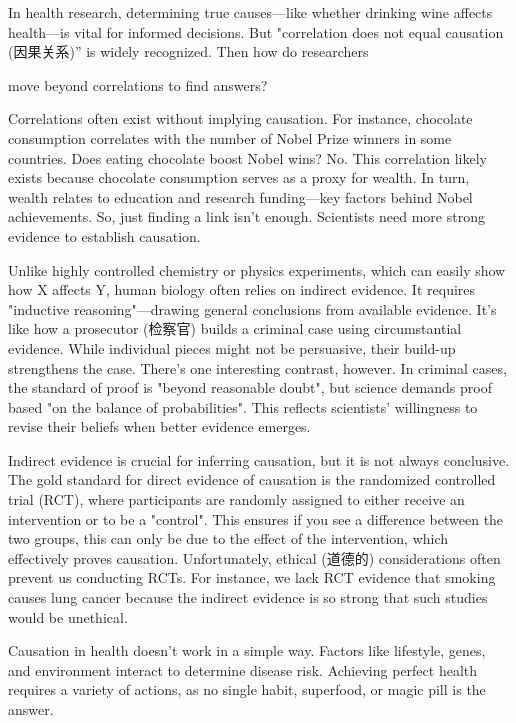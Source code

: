 \documentclass{英语试卷}
\begin{document}
\par In health research, determining true causes—like whether drinking wine affects health—is vital for informed decisions. But "correlation does not equal causation (因果关系)” is widely recognized. Then how do researchers\par
\par move beyond correlations to find answers?\par
\par Correlations often exist without implying causation. For instance, chocolate consumption correlates with the number of Nobel Prize winners in some countries. Does eating chocolate boost Nobel wins? No. This correlation likely exists because chocolate consumption serves as a proxy for wealth. In turn, wealth relates to education and research funding—key factors behind Nobel achievements. So, just finding a link isn't enough. Scientists need more strong evidence to establish causation.\par
\par Unlike highly controlled chemistry or physics experiments, which can easily show how X affects Y, human biology often relies on indirect evidence. It requires "inductive reasoning"—drawing general conclusions from available evidence. It's like how a prosecutor (检察官) builds a criminal case using circumstantial evidence. While individual pieces might not be persuasive, their build-up strengthens the case. There's one interesting contrast, however. In criminal cases, the standard of proof is "beyond reasonable doubt", but science demands proof based "on the balance of probabilities". This reflects scientists' willingness to revise their beliefs when better evidence emerges.\par
\par Indirect evidence is crucial for inferring causation, but it is not always conclusive. The gold standard for direct evidence of causation is the randomized controlled trial (RCT), where participants are randomly assigned to either receive an intervention or to be a "control". This ensures if you see a difference between the two groups, this can only be due to the effect of the intervention, which effectively proves causation. Unfortunately, ethical (道德的) considerations often prevent us conducting RCTs. For instance, we lack RCT evidence that smoking causes lung cancer because the indirect evidence is so strong that such studies would be unethical.\par
\par Causation in health doesn't work in a simple way. Factors like lifestyle, genes, and environment interact to determine disease risk. Achieving perfect health requires a variety of actions, as no single habit, superfood, or magic pill is the answer.\par
\end{document}
